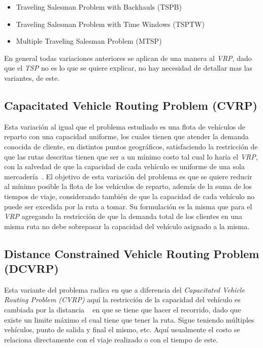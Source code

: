 \documentclass[letter, 10pt]{article}
\begin{document}
\begin{itemize}
 \item Traveling Salesman Problem with Backhauls (TSPB)
 \item Traveling Salesman Problem with Time Windows (TSPTW)
 \item Multiple Traveling Salesman Problem (MTSP)
\end{itemize}

En general todas variaciones anteriores se aplican de una manera al \emph{VRP}, dado que el \emph{TSP} no es lo que se quiere explicar, no hay necesidad de
detallar mas las variantes, de este.

\subsection{Capacitated Vehicle Routing Problem (CVRP)}
Esta variaci\'on al igual que el problema estudiado es una flota de veh\'iculos de reparto con una capacidad uniforme, los cuales 
tienen que atender la demanda conocida de cliente, en distintos puntos geogr\'aficos, satisfaciendo la restricci\'on de que las rutas descritas tienen
que ser a un m\'inimo costo tal cual lo har\'ia el \emph{VRP}, con la salvedad de que la capacidad de cada veh\'iculo es 
uniforme de una sola mercader\'ia~\cite{CVRP}.
\newline
El objetivo de esta variaci\'on del problema es que se quiere reducir al m\'inimo posible la flota de los veh\'iculos de reparto, adem\'as 
de la suma de los tiempos de viaje, considerando tambi\'en de que la capacidad de cada veh\'iculo no puede ser excedida por la ruta a tomar.
Su formulaci\'on es la misma que para el \emph{VRP} agregando la restricci\'on de que la demanda total de los clientes en una misma ruta
no debe sobrepasar la capacidad del veh\'iculo asignado a la misma.


\subsection{Distance Constrained Vehicle Routing Problem (DCVRP)}

Esta variante del problema radica en que a diferencia del \emph{Capacitated Vehicle Routing Problem (CVRP)} aqu\'i la restricci\'on de la capacidad
del veh\'iculo es cambiada por la distancia ~\cite{TSP} en que se tiene que hacer el recorrido, dado que existe un limite m\'aximo el cual 
tiene que tener la ruta. Sigue teniendo m\'ultiples veh\'iculos, punto de salida y final el mismo, etc.
Aqu\'i usualmente el costo se relaciona directamente con el viaje realizado o con el tiempo de este.
\end{document}
